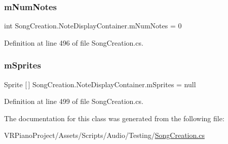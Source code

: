 \subsubsection{\texorpdfstring{m\+Num\+Notes}{mNumNotes}}
{\footnotesize\ttfamily int Song\+Creation.\+Note\+Display\+Container.\+m\+Num\+Notes = 0\hspace{0.3cm}{\ttfamily [private]}}



Definition at line 496 of file Song\+Creation.\+cs.

\mbox{\label{class_song_creation_1_1_note_display_container_ab8dbbd27a233f83f0402608e15699ecf}} 
\subsubsection{\texorpdfstring{m\+Sprites}{mSprites}}
{\footnotesize\ttfamily Sprite \mbox{[}$\,$\mbox{]} Song\+Creation.\+Note\+Display\+Container.\+m\+Sprites = null\hspace{0.3cm}{\ttfamily [private]}}



Definition at line 499 of file Song\+Creation.\+cs.



The documentation for this class was generated from the following file\+:\begin{DoxyCompactItemize}
\item 
V\+R\+Piano\+Project/\+Assets/\+Scripts/\+Audio/\+Testing/\hyperlink{_song_creation_8cs}{Song\+Creation.\+cs}\end{DoxyCompactItemize}

